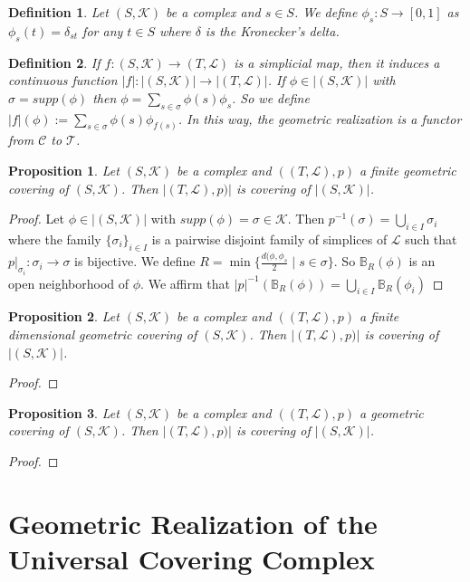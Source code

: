 \documentclass{amsart}
\newtheorem{proposition}{Proposition}[section]
\newtheorem{definition}{Definition}[section]
\begin{document}
\begin{definition}
Let $(S,\mathcal{K})$ be a complex and $s\in S$. We define $\phi_s\colon S\longrightarrow [0,1]$ as $\phi_s(t)=\delta_{st}$ for any $t\in S$ where $\delta$ is the Kronecker's delta.
\end{definition}

\begin{definition}
If $f\colon (S,\mathcal{K})\longrightarrow (T,\mathcal{L})$ is a simplicial map, then it induces a continuous function $\vert f\vert\colon \vert(S,\mathcal{K})\vert\longrightarrow \vert(T,\mathcal{L})\vert$. If $\phi\in \vert(S,\mathcal{K})\vert$ with $\sigma=supp(\phi)$ then $\phi=\sum_{s\in\sigma}\phi(s)\phi_s$. So  we define $\vert f\vert (\phi):=\sum_{s\in \sigma}\phi(s)\phi_{f(s)}$. In this way, the geometric realization is a functor from $\mathcal{C}$ to $\mathcal{T}$.
\end{definition}

\begin{proposition}
Let $(S,\mathcal{K})$ be a complex and $((T,\mathcal{L}),p)$ a finite geometric covering of $(S,\mathcal{K})$. Then $\vert (T,\mathcal{L}), p)\vert $ is covering of $\vert (S,\mathcal{K})\vert$.
\end{proposition}

\begin{proof}
Let $\phi\in \vert (S,\mathcal{K})\vert$ with $supp(\phi)=\sigma\in\mathcal{K}$. Then $p^{-1}(\sigma)=\bigcup_{i\in I}\sigma_i$ where the family $\{\sigma_i\}_{i\in I}$ is a pairwise disjoint family of simplices of $\mathcal{L}$ such that $p|_{\sigma_i}\colon \sigma_i\longrightarrow \sigma$ is bijective.  We define $R=\min\{\frac{d(\phi,\phi_s}{2}\mid s\in\sigma\}$. So $\mathbb{B}_R(\phi)$ is an open neighborhood of $\phi$. We affirm that $\vert p\vert^{-1}(\mathbb{B}_R(\phi))=\bigcup_{i\in I}\mathbb{B}_R(\phi_i)$
\end{proof}

\begin{proposition}
Let $(S,\mathcal{K})$ be a complex and $((T,\mathcal{L}),p)$ a finite dimensional geometric covering of $(S,\mathcal{K})$. Then $\vert (T,\mathcal{L}), p)\vert $ is covering of $\vert (S,\mathcal{K})\vert$.
\end{proposition}

\begin{proof}

\end{proof}

\begin{proposition}
Let $(S,\mathcal{K})$ be a complex and $((T,\mathcal{L}),p)$ a geometric covering of $(S,\mathcal{K})$. Then $\vert (T,\mathcal{L}), p)\vert $ is covering of $\vert (S,\mathcal{K})\vert$.
\end{proposition}

\begin{proof}

\end{proof}


\section{Geometric Realization of the Universal Covering Complex}





\end{document}
